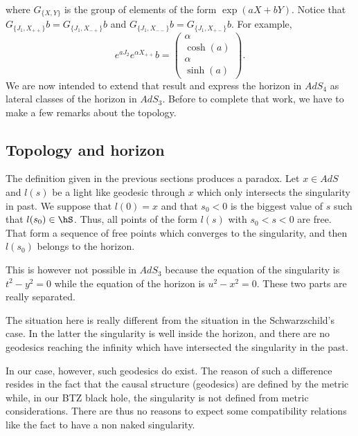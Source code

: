 	where $G_{\{ X,Y \}}$ is the group of elements of the form $\exp(aX+bY)$. Notice that $G_{\{ J_1,X_{++} \}}b=G_{\{ J_1,X_{-+} \}}b$ and $G_{\{ J_1,X_{--} \}}b=G_{\{ J_1,X_{+-} \}}b$. For example,
	\begin{equation}
		e^{aJ_2} e^{\alpha X_{++}}b=\begin{pmatrix}
			\alpha   \\
			\cosh(a) \\
			\alpha   \\
			\sinh(a)
		\end{pmatrix}.
	\end{equation}
	We are now intended to extend that result and express the horizon in $AdS_4$ as lateral classes of the horizon in $AdS_3$. Before to complete that work, we have to make a few remarks about the topology.

	\subsection{Topology and horizon}
	\label{subSecTopoHor}

	The definition given in the previous sections produces a paradox. Let $x\in AdS$ and $l(s)$ be a light like geodesic through $x$ which only intersects the singularity in past. We suppose that $l(0)=x$ and that $s_0<0$ is the biggest value of $s$ such that $l(s_0)\in \hS$. Thus, all points of the form $l(s)$ with $s_0<s<0$ are free. That form a sequence of free points which converges to the singularity, and then $l(s_0)$ belongs to the horizon.

	This is however not possible in $AdS_3$ because the equation of the singularity is $t^2-y^2=0$ while the equation of the horizon is $u^2-x^2=0$. These two parts are really separated.

	The situation here is really different from the situation in the Schwarzschild's case. In the latter the singularity is well inside the horizon, and there are no geodesics reaching the infinity which have intersected the singularity in the past.

	In our case, however, such geodesics do exist. The reason of such a difference resides in the fact that the causal structure (geodesics) are defined by the metric while, in our BTZ black hole, the singularity is not defined from metric considerations. There are thus no reasons to expect some compatibility relations like the fact to have a non naked singularity.

